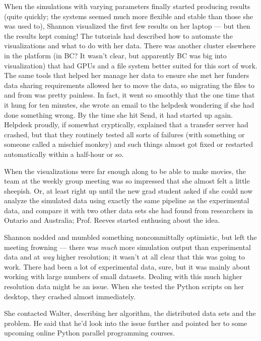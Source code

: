 \documentclass[11pt, letterpaper, twoside]{article}
\begin{document}
\begin{tcolorbox}[enhanced,breakable,colback=gray!15,colframe=cdaRed,parbox=false]
When the simulations with varying parameters finally started producing
results (quite quickly; the systems seemed much more flexible and stable
than those she was used to), Shannon visualized the first few results on
her laptop --- but then the results kept coming!  The tutorials had
described how to automate the visualizations and what to do with her
data. There was another cluster elsewhere in the platform (in BC? It
wasn't clear, but apparently BC was big into visualization) that had
GPUs and a file system better suited for this sort of work. The same
tools that helped her manage her data to ensure she met her funders data
sharing requirements allowed her to move the data, so migrating the
files to and from was pretty painless. In fact, it went so smoothly that
the one time that it hung for ten minutes, she wrote an email to the
helpdesk wondering if she had done something wrong. By the time she hit
Send, it had started up again.  Helpdesk proudly, if somewhat
cryptically, explained that a transfer server had crashed, but that they
routinely tested all sorts of failures (with something or someone called
a mischief monkey) and such things almost got fixed or restarted
automatically within a half-hour or so.

When the visualizations were far enough along to be able to make movies,
the team at the weekly group meeting was so impressed that she almost
felt a little sheepish. Or, at least right up until the new grad student
asked if she could now analyze the simulated data using exactly the same
pipeline as the experimental data, and compare it with two other data
sets she had found from researchers in Ontario and Australia; Prof.
Reeves started enthusing about the idea.

Shannon nodded and mumbled something noncommittally optimistic, but left
the meeting frowning --- there was \textit{much} more simulation output
than experimental data and at \textit{way} higher resolution; it wasn't
at all clear that this was going to work. There had been a lot of
experimental data, sure, but it was mainly about working with large
numbers of small datasets. Dealing with this much higher resolution data
might be an issue. When she tested the Python scripts on her desktop,
they crashed almost immediately.

She contacted Walter, describing her algorithm, the distributed data
sets and the problem. He said that he'd look into the issue further and
pointed her to some upcoming online Python parallel programming
courses.


\end{tcolorbox}
\end{document}
